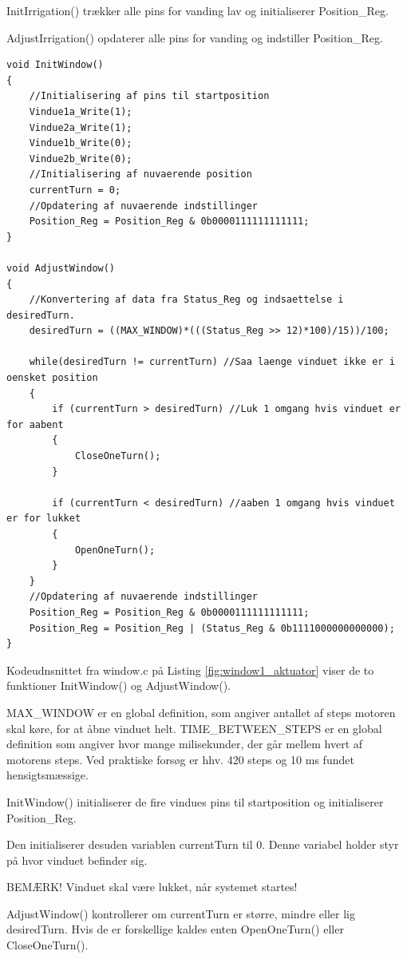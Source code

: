 InitIrrigation() trækker alle pins for vanding lav og initialiserer Position\_Reg.

AdjustIrrigation() opdaterer alle pins for vanding og indstiller Position\_Reg.

\clearpage

\begin{lstlisting}[caption=Udsnit A af window.c for PSoC4 i Aktuator, label=fig:window1_aktuator]
void InitWindow()
{
    //Initialisering af pins til startposition
    Vindue1a_Write(1);
    Vindue2a_Write(1);
    Vindue1b_Write(0);
    Vindue2b_Write(0);
    //Initialisering af nuvaerende position
    currentTurn = 0;
    //Opdatering af nuvaerende indstillinger
    Position_Reg = Position_Reg & 0b0000111111111111;
}

void AdjustWindow()
{      
    //Konvertering af data fra Status_Reg og indsaettelse i desiredTurn.
    desiredTurn = ((MAX_WINDOW)*(((Status_Reg >> 12)*100)/15))/100;
    
    while(desiredTurn != currentTurn) //Saa laenge vinduet ikke er i oensket position
    {
        if (currentTurn > desiredTurn) //Luk 1 omgang hvis vinduet er for aabent
        {
            CloseOneTurn();
        }
    
        if (currentTurn < desiredTurn) //aaben 1 omgang hvis vinduet er for lukket
        {
            OpenOneTurn();
        }
    }
    //Opdatering af nuvaerende indstillinger
    Position_Reg = Position_Reg & 0b0000111111111111;
    Position_Reg = Position_Reg | (Status_Reg & 0b1111000000000000);
}
\end{lstlisting}

Kodeudnsnittet fra window.c på Listing \ref{fig:window1_aktuator} viser de to funktioner InitWindow() og AdjustWindow().

MAX\_WINDOW er en global definition, som angiver antallet af steps motoren skal køre, for at åbne vinduet helt. 
TIME\_BETWEEN\_STEPS er en global definition som angiver hvor mange milisekunder, der går mellem hvert af motorens steps. 
Ved praktiske forsøg er hhv. 420 steps og 10 ms fundet hensigtsmæssige.

InitWindow() initialiserer de fire vindues pins til startposition og initialiserer Position\_Reg. 

Den initialiserer desuden variablen currentTurn til 0. Denne variabel holder styr på hvor vinduet befinder sig. 

BEMÆRK! Vinduet skal være lukket, når systemet startes!

AdjustWindow() kontrollerer om currentTurn er større, mindre eller lig desiredTurn. Hvis de er forskellige kaldes enten OpenOneTurn() eller CloseOneTurn().

